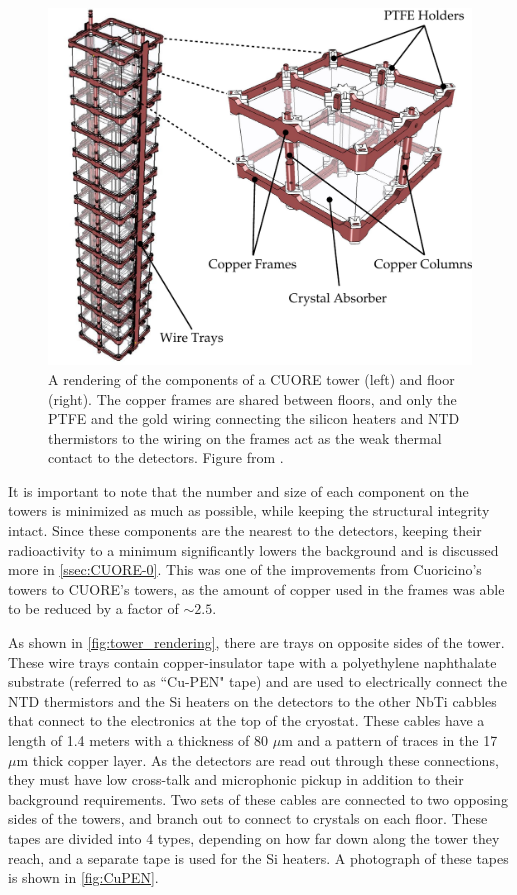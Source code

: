 \begin{figure}
    \centering
    \includegraphics[width=0.8\linewidth]{Figures/fig02.pdf}
    \caption[A rendering of the components of a single CUORE tower (left) and floor (right).]
    {A rendering of the components of a CUORE tower (left) and floor (right).
    The copper frames are shared between floors, and only the PTFE and the gold wiring connecting the silicon heaters and NTD thermistors to the wiring on the frames act as the weak thermal contact to the detectors.
    Figure from \cite{Alduino:2016vjd}.}
    \label{fig:tower_rendering}
\end{figure}
It is important to note that the number and size of each component on the towers is minimized as much as possible, while keeping the structural integrity intact.
Since these components are the nearest to the detectors, keeping their radioactivity to a minimum significantly lowers the background and is discussed more in \autoref{ssec:CUORE-0}.
This was one of the improvements from Cuoricino's towers to CUORE's towers, as the amount of copper used in the frames was able to be reduced by a factor of $\sim2.5$.

As shown in \autoref{fig:tower_rendering}, there are trays on opposite sides of the tower.
These wire trays contain copper-insulator tape with a polyethylene naphthalate substrate (referred to as ``Cu-PEN" tape) and are used to electrically connect the NTD thermistors and the Si heaters on the detectors to the other NbTi cabbles that connect to the electronics at the top of the cryostat.
These cables have a length of 1.4 meters with a thickness of 80 $\mu \textrm{m}$ and a pattern of traces in the 17 $\mu \textrm{m}$ thick copper layer.
As the detectors are read out through these connections, they must have low cross-talk and microphonic pickup in addition to their background requirements.
Two sets of these cables are connected to two opposing sides of the towers, and branch out to connect to crystals on each floor.
These tapes  are divided into 4 types, depending on how far down along the tower they reach, and a separate tape is used for the Si heaters.
A photograph of these tapes is shown in \autoref{fig:CuPEN}.

